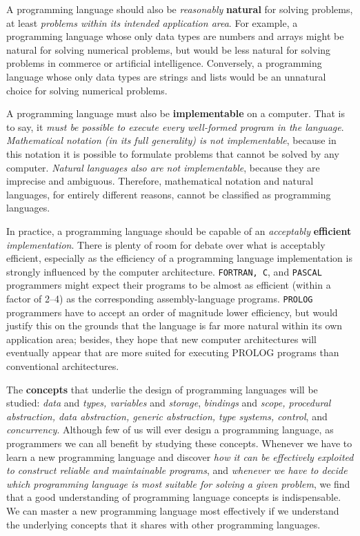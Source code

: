 \documentclass{article}
\begin{document}
A programming language should also be \textit{reasonably} \textbf{natural} for solving problems, at least \textit{problems within its intended application area}. For example, a programming language whose only data types are numbers and arrays might be natural for solving numerical problems, but would be less natural for solving problems in commerce or artificial intelligence. Conversely, a programming language whose only data types are strings and lists would be an unnatural choice for solving numerical problems.

A programming language must also be \textbf{implementable} on a computer. That is to say, it \textit{must be possible to execute every well-formed program in the language}. \textit{Mathematical notation (in its full generality) is not implementable}, because in this notation it is possible to formulate problems that cannot be solved by any computer. \textit{Natural languages also are not implementable}, because they are imprecise and ambiguous. Therefore, mathematical notation and natural languages, for entirely different reasons, cannot be classified as programming languages.

In practice, a programming language should be capable of an \textit{acceptably} \textbf{efficient}\textit{ implementation}. There is plenty of room for debate over what is acceptably efficient, especially as the efficiency of a programming language implementation is strongly influenced by the computer architecture. \texttt{FORTRAN, C}, and \texttt{PASCAL} programmers might expect their programs to be almost as efficient (within a factor of 2–4) as the corresponding assembly-language programs. \texttt{PROLOG} programmers have to accept an order of magnitude lower efficiency, but would justify this on the grounds that the language is far more natural within its own application area; besides, they hope that new computer architectures will eventually appear that are more suited for executing PROLOG programs than conventional architectures.

The \textbf{concepts} that underlie the design of programming languages will be studied: \textit{data} and \textit{types, variables} and \textit{storage}, \textit{bindings} and \textit{scope, procedural abstraction, data abstraction, generic abstraction, type systems, control}, and \textit{concurrency}. Although few of us will ever design a programming language, as programmers we can all benefit by studying these concepts. Whenever we have to learn a new programming language and discover \textit{how it can be effectively exploited to construct reliable and maintainable programs}, and \textit{whenever we have to decide which programming language is most suitable for solving a given problem}, we find that a good understanding of programming language concepts is indispensable. We can master a new programming language most effectively if we understand the underlying concepts that it shares with other programming languages.
\end{document}
